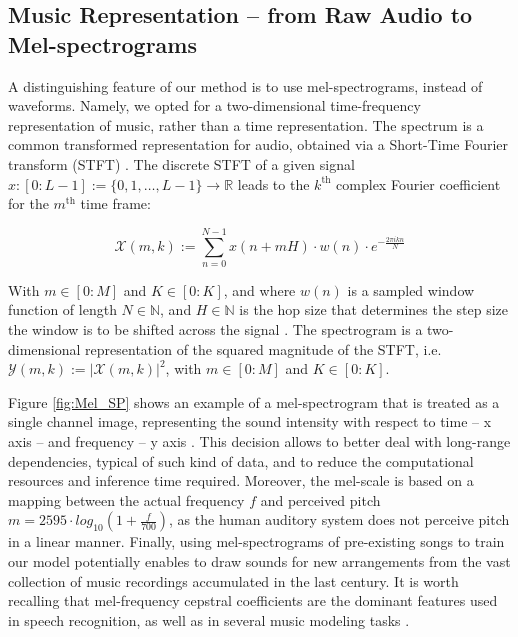 \documentclass[journal]{IEEEtran}
\begin{document}



\subsection{Music Representation -- from Raw Audio to Mel-spectrograms}

A distinguishing feature of our method is to use mel-spectrograms, instead of waveforms. Namely, we opted for a two-dimensional time-frequency representation of music, rather than a time representation. The spectrum is a common transformed representation for audio, obtained via a Short-Time Fourier transform (STFT) \cite{muller2015fundamentals}. The discrete STFT of a given signal $x:[0:L-1]:=\{0,1,\ldots,L-1\}\to{\mathbb R}$ leads to the $k^{\mathrm{th}}$ complex Fourier coefficient for the $m^{\mathrm{th}}$ time frame:

$$
\mathcal{X}(m,k) := \sum_{n=0}^{N-1} x(n+mH)\cdot w(n)\cdot e^{-\frac{2\pi ikn}{N}}
$$

With $m\in[0:M]$ and $K\in[0:K]$, and where $w(n)$ is a sampled window function of length $N\in\mathbb{N}$, and $H\in\mathbb{N}$ is the hop size that determines the step size the window is to be shifted across the signal \cite{muller2015fundamentals}. The spectrogram is a two-dimensional representation of the squared magnitude of the STFT, i.e. $\mathcal{Y}(m,k) := | \mathcal{X}(m,k)|^2$, with $m\in[0:M]$
and $K\in[0:K]$. 

Figure \ref{fig:Mel_SP} shows an example of a mel-spectrogram \cite{mel_scale} that is treated as a single channel image, representing the sound intensity with respect to time -- x axis -- and frequency -- y axis \cite{briot2020deep}. This decision allows to better deal with long-range dependencies, typical of such kind of data, and to reduce the computational resources and inference time required. Moreover, the mel-scale is based on a mapping between the actual frequency $f$ and perceived pitch $m = 2595 \cdot log_{10}(1 + \frac{f}{700})$, as the human auditory system does not perceive pitch in a linear manner. Finally, using mel-spectrograms of pre-existing songs to train our model potentially enables to draw sounds for new arrangements from the vast collection of music recordings accumulated in the last century. It is worth recalling that mel-frequency cepstral coefficients are the dominant features used in speech recognition, as well as in several music modeling tasks \cite{logan2001adaptive}.
\end{document}
